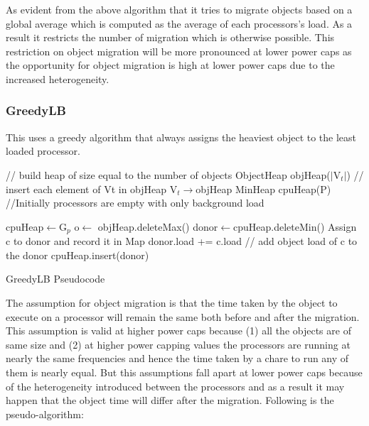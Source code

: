  As evident from the above algorithm that it tries to migrate objects based on
 a global average which is computed as the average of each processors's load. As
 a result it restricts the number of migration which is otherwise possible.
 This restriction on object migration will be more pronounced at lower power
 caps as the opportunity for object migration is high at lower power caps due 
 to the increased heterogeneity.

\subsubsection{GreedyLB}
This uses a greedy algorithm that always assigns the heaviest object to the
least loaded processor. 

\begin{algorithm}

 // build heap of size equal to the number of objects \;
 ObjectHeap objHeap($|$V$_t|$)\;
 // insert each element of Vt in objHeap\;
 V$_t\rightarrow$objHeap \; 
 MinHeap cpuHeap(P)\;
 //Initially processors are empty with only background load\; 

 cpuHeap$\leftarrow$G$_p$\;  
  {
    o$\leftarrow$ objHeap.deleteMax()\;
    donor$\leftarrow$cpuHeap.deleteMin()\;
    Assign c to donor and record it in Map\;
    donor.load += c.load // add object load of c to the donor\;
    cpuHeap.insert(donor) \;
    }
 \caption{GreedyLB Pseudocode}
\end{algorithm}

The assumption for object migration is that
the time taken by the object to execute on a processor will
remain the same both before and after the migration.
This assumption is valid at higher power caps because (1) all the objects are of same
size and (2) at higher power capping values the processors are running at nearly the same 
frequencies and hence the time taken by a chare to run any of them is nearly equal.
But this assumptions fall apart at lower power caps 
because of the heterogeneity introduced between the processors and
 as a result it may happen that the object time will differ after the migration. Following is the pseudo-algorithm:

